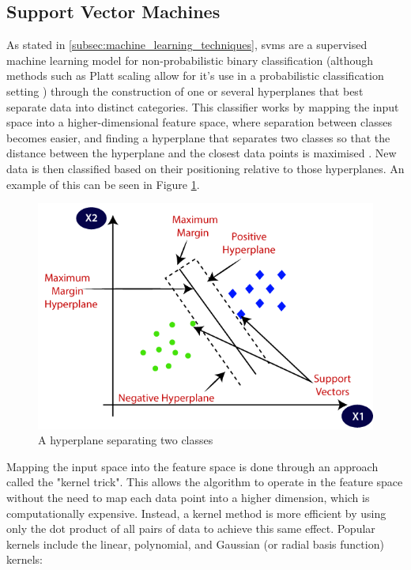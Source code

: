 
\subsection{Support Vector Machines}

As stated in \ref{subsec:machine_learning_techniques}, \glspl{svm} are a supervised machine learning model for non-probabilistic binary classification (although methods such as Platt scaling allow for it's use in a probabilistic classification setting \citep{platt1999}) through the construction of one or several hyperplanes that best separate data into distinct categories. This classifier works by mapping the input space into a higher-dimensional feature space, where separation between classes becomes easier, and finding a hyperplane that separates two classes so that the distance between the hyperplane and the closest data points is maximised \citep{Buczak2016}. New data is then classified based on their positioning relative to those hyperplanes. An example of this can be seen in Figure \ref{fig:svm_hyperplane}.

\begin{figure}
    \centering
    \includegraphics[width = .8\linewidth]{img/parts/introduction/Support Vector Machine.png}
    \caption{A hyperplane separating two classes \citep{JavaTpoint_SVM}}
    \label{fig:svm_hyperplane}
\end{figure}

Mapping the input space into the feature space is done through an approach called the "kernel trick". This allows the algorithm to operate in the feature space without the need to map each data point into a higher dimension, which is computationally expensive. Instead, a kernel method is more efficient by using only the dot product of all pairs of data to achieve this same effect. Popular kernels include the linear, polynomial, and Gaussian (or radial basis function) kernels:

